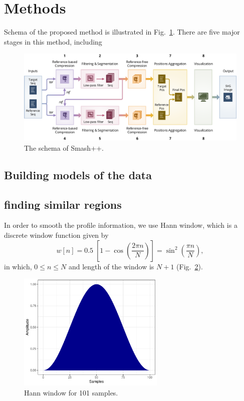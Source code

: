 \clearpage
\section{Methods}
\label{sec.methods}

Schema of the proposed method is illustrated in Fig.~\ref{fig.schema}. There are five major stages in this method, including 

\begin{figure}[!h]
\includegraphics[width=\linewidth]{schema.pdf}
\caption{The schema of Smash++.}
\label{fig.schema}
\end{figure}

\subsection{Building models of the data}

\subsection{finding similar regions}

In order to smooth the profile information, we use Hann window, which is a discrete window function given by
\begin{equation}
  \label{eq.hann}
  w[n]=0.5\;\left[1-\cos \left({\frac {2\pi n}{N}}\right)\right]=\sin ^{2}\left({\frac {\pi n}{N}}\right),
\end{equation}
in which, $0\le n\le N$ and length of the window is $N+1$ (Fig.~\ref{fig.hann}).
\begin{figure}[!h]
  \centering
\includegraphics[width=7cm]{hann.pdf}
\caption{Hann window for 101 samples.}
\label{fig.hann}
\end{figure}

